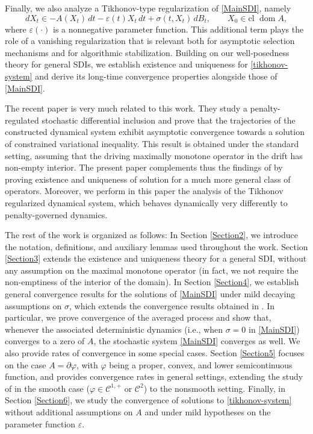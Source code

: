 \documentclass[11pt,reqno]{article}
\newcommand{\dom}{\operatorname{dom}}
\renewcommand{\epsilon}{\varepsilon}
\newcommand{\cl}{{\text{cl }}}
\newcommand{\1}{\mathds{1}}
\numberwithin{equation}{section}  %
\theoremstyle{plain}
\theoremstyle{definition}
\theoremstyle{remark}
\numberwithin{theorem}{section}
\numberwithin{remark}{section}
\numberwithin{example}{section}
\begin{document}
Finally, we also analyze a Tikhonov-type regularization of \eqref{MainSDI}, namely
\begin{equation}\label{tikhonov-system}
    dX_t \in -A(X_t)\,dt - \epsilon(t) X_t\,dt + \sigma(t,X_t)\,dB_t,
    \qquad X_0 \in \cl \dom A,
\end{equation}
where $\epsilon(\cdot)$ is a nonnegative parameter function. This additional term plays the role of a vanishing
regularization that is relevant both for asymptotic selection mechanisms and for algorithmic stabilization.
Building on our well-posedness theory for general SDIs, we establish existence and uniqueness for
\eqref{tikhonov-system} and derive its long-time convergence properties alongside those of
\eqref{MainSDI}.

The recent paper \cite{luke2026asymptotic} is very much related to this work. They study a penalty-regulated stochastic differential inclusion and prove that the trajectories of the constructed dynamical system exhibit asymptotic convergence towards a solution of constrained variational inequality. This result is obtained under the standard setting, assuming that the driving maximally monotone operator in the drift has non-empty interior. The present paper complements thus the findings of \cite{luke2026asymptotic} by proving existence and uniqueness of solution for a much more general class of operators. Moreover, we perform in this paper the analysis of the Tikhonov regularized dynamical system, which behaves dynamically very differently to penalty-governed dynamics.  

 The rest of the work is organized as follows: In Section \ref{Section2}, we introduce the notation, definitions, and auxiliary lemmas used throughout the work. Section \ref{Section3} extends the existence and uniqueness theory for a general SDI, without any assumption on the maximal monotone operator (in fact, we not require the non-emptiness of the interior of the domain). In Section \ref{Section4}, we establish general convergence results for the solutions of \eqref{MainSDI} under mild decaying assumptions on $\sigma$, which extends the convergence results obtained in \cite{MR4989859}. In particular, we prove convergence of the averaged process and show that, whenever the associated deterministic dynamics (i.e., when $\sigma = 0$ in \eqref{MainSDI}) converges to a zero of $A$, the stochastic system \eqref{MainSDI} converges as well. We also provide rates of convergence in some special cases. Section \ref{Section5} focuses on the case $A = \partial \varphi$, with $\varphi$ being a proper, convex, and lower semicontinuous function, and provides convergence rates in general settings, extending the study of \cite{MR4989859, MR3747470} in the smooth case ($\varphi\in \mathcal{C}^{1,+}$ or $\mathcal{C}^2$) to the nonsmooth setting. Finally, in Section \ref{Section6}, we study the convergence of solutions to \eqref{tikhonov-system} without additional assumptions on $A$ and under mild hypotheses on the parameter function $\epsilon$.
\end{document}
